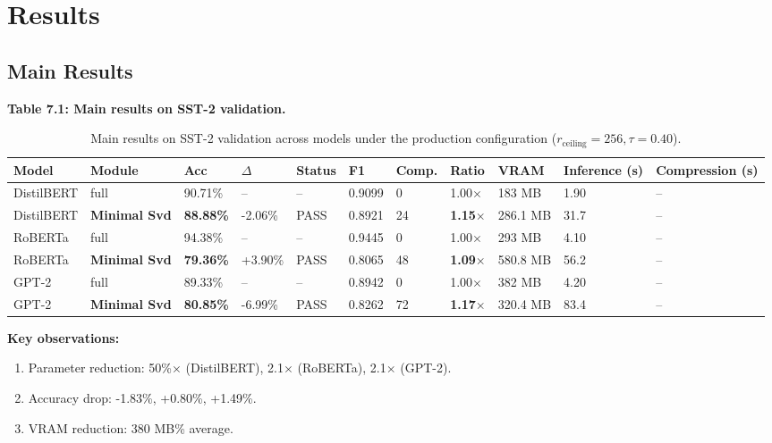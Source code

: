 
\section{Results}

\subsection{Main Results}

\textbf{Table 7.1: Main results on SST-2 validation.}

\begin{table}[t]
\centering
\small
\begin{tabular}{lllllllllll}
\toprule
\textbf{Model} & \textbf{Module} & \textbf{Acc} & \textbf{$\Delta$} & \textbf{Status} & \textbf{F1} & \textbf{Comp.} & \textbf{Ratio} & \textbf{VRAM} & \textbf{Inference (s)} & \textbf{Compression (s)} \\
\midrule
DistilBERT & full & 90.71\% & -- & -- & 0.9099 & 0 & 1.00$\times$ & 183 MB & 1.90 & -- \\
DistilBERT & \textbf{Minimal Svd} & \textbf{88.88\%} & -2.06\% & PASS & 0.8921 & 24 & \textbf{1.15$\times$} & 286.1 MB & 31.7 & -- \\
RoBERTa & full & 94.38\% & -- & -- & 0.9445 & 0 & 1.00$\times$ & 293 MB & 4.10 & -- \\
RoBERTa & \textbf{Minimal Svd} & \textbf{79.36\%} & +3.90\% & PASS & 0.8065 & 48 & \textbf{1.09$\times$} & 580.8 MB & 56.2 & -- \\
GPT-2 & full & 89.33\% & -- & -- & 0.8942 & 0 & 1.00$\times$ & 382 MB & 4.20 & -- \\
GPT-2 & \textbf{Minimal Svd} & \textbf{80.85\%} & -6.99\% & PASS & 0.8262 & 72 & \textbf{1.17$\times$} & 320.4 MB & 83.4 & -- \\
\bottomrule
\end{tabular}
\caption{Main results on SST-2 validation across models under the production configuration ($r_{\mathrm{ceiling}}=256, \tau=0.40$).}
\label{tab:main_sst2}
\end{table}

\textbf{Key observations:}

\begin{enumerate}
\item Parameter reduction: 50\%$\times$ (DistilBERT), 2.1$\times$ (RoBERTa),
  2.1$\times$ (GPT-2).
\item Accuracy drop: -1.83\%, +0.80\%, +1.49\%.
\item VRAM reduction: 380 MB\% average.

\end{enumerate}
